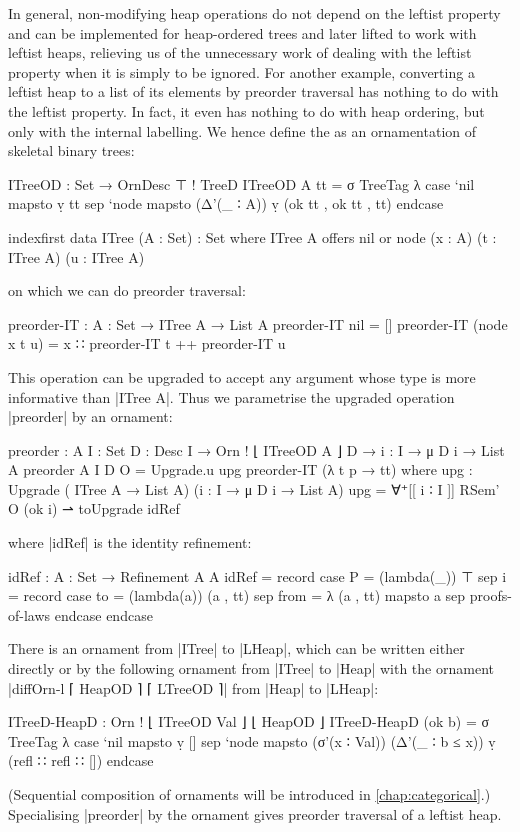 In general, non-modifying heap operations do not depend on the leftist property and can be implemented for heap-ordered trees and later lifted to work with leftist heaps, relieving us of the unnecessary work of dealing with the leftist property when it is simply to be ignored.
For another example, converting a leftist heap to a list of its elements by preorder traversal has nothing to do with the leftist property.
In fact, it even has nothing to do with heap ordering, but only with the internal labelling.
We hence define the  as an ornamentation of skeletal binary trees:
\begin{code}
ITreeOD : Set → OrnDesc ⊤ ! TreeD
ITreeOD A tt = σ TreeTag  λ  case  `nil   mapsto  ṿ tt
                             sep   `node  mapsto  (Δ'(_ ∶ A)) ṿ (ok tt , ok tt , tt) endcase

indexfirst data ITree (A : Set) : Set where
  ITree A  offers  nil
           or      node (x : A) (t : ITree A) (u : ITree A)
\end{code}
on which we can do preorder traversal:
\begin{code}
preorder-IT : {A : Set} → ITree A → List A
preorder-IT nil           =  []
preorder-IT (node x t u)  =  x ∷ preorder-IT t ++ preorder-IT u
\end{code}
This operation can be upgraded to accept any argument whose type is more informative than |ITree A|.
Thus we parametrise the upgraded operation |preorder| by an ornament:
\begin{code}
preorder :  {A I : Set} {D : Desc I} → Orn ! ⌊ ITreeOD A ⌋ D →
            {i : I} → μ D i → List A
preorder {A} {I} {D} O = Upgrade.u upg preorder-IT (λ t p → tt)
  where  upg : Upgrade  (           ITree A  → List A)
                        ({i : I} →  μ D i    → List A)
         upg = ∀⁺[[ i ∶ I ]] RSem' O (ok i) ⇀ toUpgrade idRef
\end{code}
where |idRef| is the identity refinement:
\begin{code}
idRef : {A : Set} → Refinement A A
idRef = record  case  P  = (lambda(_)) ⊤
                sep   i  = record  case  to    = (lambda(a)) (a , tt)
                                   sep   from  = λ { (a , tt) mapsto a }
                                   sep   proofs-of-laws endcase endcase
\end{code}
There is an ornament from |ITree| to |LHeap|, which can be written either directly or by  the following ornament from |ITree| to |Heap| with the ornament |diffOrn-l ⌈ HeapOD ⌉ ⌈ LTreeOD ⌉| from |Heap| to |LHeap|:
\begin{code}
ITreeD-HeapD : Orn ! ⌊ ITreeOD Val ⌋ ⌊ HeapOD ⌋
ITreeD-HeapD (ok b) =
  σ TreeTag λ  case  `nil   mapsto  ṿ []
               sep   `node  mapsto  (σ'(x ∶ Val)) (Δ'(_ ∶ b ≤ x)) ṿ (refl ∷ refl ∷ []) endcase
\end{code}
(Sequential composition of ornaments will be introduced in \autoref{chap:categorical}.)
Specialising |preorder| by the ornament gives preorder traversal of a leftist heap.

